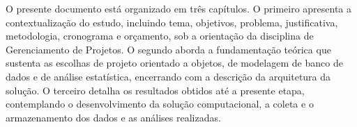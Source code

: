 O presente documento está organizado em três capítulos. O primeiro apresenta a contextualização do estudo, incluindo tema, objetivos, problema, justificativa, metodologia, cronograma e orçamento, sob a orientação da disciplina de Gerenciamento de Projetos. O segundo aborda a fundamentação teórica que sustenta as escolhas de projeto orientado a objetos, de modelagem de banco de dados e de análise estatística, encerrando com a descrição da arquitetura da solução. O terceiro detalha os resultados obtidos até a presente etapa, contemplando o desenvolvimento da solução computacional, a coleta e o armazenamento dos dados e as análises realizadas.
